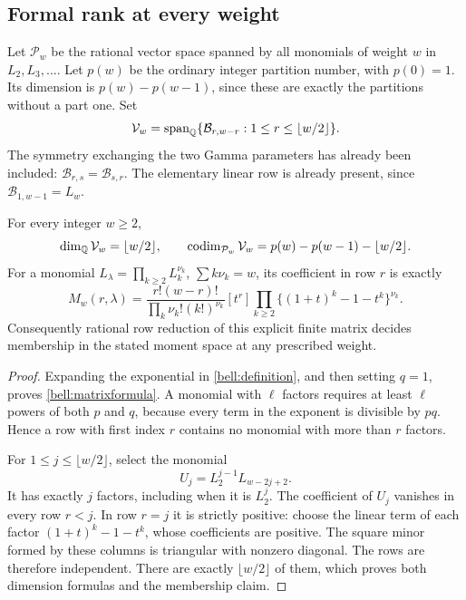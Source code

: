 \subsection{Formal rank at every weight}

Let $\mathcal P_w$ be the rational vector space spanned by all monomials
of weight $w$ in $L_2,L_3,\ldots$. Let $p(w)$ be the ordinary integer
partition number, with $p(0)=1$. Its dimension is
$p(w)-p(w-1)$, since these are exactly the partitions without a part one.
Set
\[
 \mathcal V_w=\operatorname{span}_{\mathbb Q}\{\mathcal B_{r,w-r}:1\le r\le\lfloor w/2\rfloor\}.
\]
The symmetry exchanging the two Gamma parameters has already been
included: $\mathcal B_{r,s}=\mathcal B_{s,r}$. The elementary linear
row is already present, since $\mathcal B_{1,w-1}=L_w$.

\begin{theorem}
\label{bell:rank}
For every integer $w\ge2$,
\begin{equation}
 \dim_{\mathbb Q}\mathcal V_w=\lfloor w/2\rfloor,\qquad
 \operatorname{codim}_{\mathcal P_w}\mathcal V_w
       =p(w)-p(w-1)-\lfloor w/2\rfloor.
 \label{bell:rankformula}
\end{equation}
For a monomial $L_\lambda=\prod_{k\ge2}L_k^{\nu_k}$,
$\sum k\nu_k=w$, its coefficient in row $r$ is exactly
\begin{equation}
 M_w(r,\lambda)
 =\frac{r!(w-r)!}{\prod_k\nu_k!(k!)^{\nu_k}}
 [t^r]\prod_{k\ge2}\{(1+t)^k-1-t^k\}^{\nu_k}.
 \label{bell:matrixformula}
\end{equation}
Consequently rational row reduction of this explicit finite matrix
decides membership in the stated moment space at any prescribed weight.
\end{theorem}

\begin{proof}
Expanding the exponential in \eqref{bell:definition}, and then setting
$q=1$, proves \eqref{bell:matrixformula}. A monomial with $\ell$ factors
requires at least $\ell$ powers of both $p$ and $q$, because every
term in the exponent is divisible by $pq$. Hence a row with first
index $r$ contains no monomial with more than $r$ factors.

For $1\le j\le\lfloor w/2\rfloor$, select the monomial
\[
 U_j=L_2^{j-1}L_{w-2j+2}.
\]
It has exactly $j$ factors, including when it is $L_2^j$. The
coefficient of $U_j$ vanishes in every row $r<j$. In row $r=j$ it is
strictly positive: choose the linear term of each factor
$(1+t)^k-1-t^k$, whose coefficients are positive. The square minor
formed by these columns is triangular with nonzero diagonal. The
rows are therefore independent. There are exactly $\lfloor w/2\rfloor$
of them, which proves both dimension formulas and the membership claim.
\end{proof}

